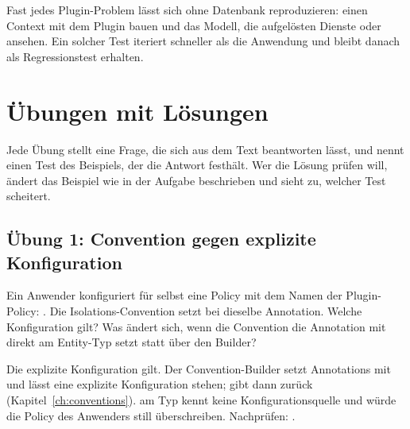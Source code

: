 \begin{tip}
  Fast jedes Plugin-Problem lässt sich ohne Datenbank reproduzieren: einen Context mit dem
  Plugin bauen und das Modell, die aufgelösten Dienste oder
   ansehen. Ein solcher Test
  iteriert schneller als die Anwendung und bleibt danach als Regressionstest erhalten.
\end{tip}

\chapter{Übungen mit Lösungen}\label{app:E}

Jede Übung stellt eine Frage, die sich aus dem Text beantworten lässt, und nennt einen Test des
Beispiels, der die Antwort festhält. Wer die Lösung prüfen will, ändert das Beispiel wie in der
Aufgabe beschrieben und sieht zu, welcher Test scheitert.

\section{Übung 1: Convention gegen explizite Konfiguration}

Ein Anwender konfiguriert für  selbst eine Policy mit dem Namen der
Plugin-Policy: . Die
Isolations-Convention setzt bei  dieselbe Annotation. Welche
Konfiguration gilt? Was ändert sich, wenn die Convention die Annotation mit
 direkt am Entity-Typ setzt statt über den Builder?

\begin{note}[Lösung]
  Die explizite Konfiguration gilt. Der Convention-Builder setzt Annotations mit
   und lässt eine explizite
  Konfiguration stehen;  gibt dann  zurück
  (Kapitel~\ref{ch:conventions}).  am Typ kennt keine
  Konfigurationsquelle und würde die Policy des Anwenders still überschreiben.
  Nachprüfen: .
\end{note}


